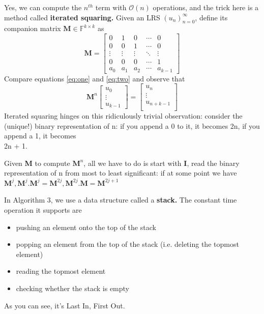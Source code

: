 \documentclass{article}
\begin{document}
Yes, we can compute the $n^{th}$ term with $\mathcal{O}(n)$ operations, and the trick here is a method called \textbf{iterated squaring.} Given an LRS $(u_n)_{n=0}^{\infty}$, define its companion matrix $\textbf{M} \in \mathbb{F}^{k \times k}$ as
\begin{equation}
\label{eq:two}
    \textbf{M} = 
    \begin{bmatrix}
     0 & 1 & 0 & \cdots & 0 \\
     0 & 0 & 1 & \cdots & 0 \\
     \vdots & \vdots & \vdots & \ddots & \vdots \\
     0 & 0 & 0 & \cdots & 1 \\
     a_{0} & a_{1} & a_{2} & \cdots & a_{k-1}
    \end{bmatrix}
\end{equation}
Compare equations \ref{eq:one} and \ref{eq:two} and observe that
\begin{equation}
\label{eq:three}
    \textbf{M}^n
    \begin{bmatrix}
     u_0 \\
     \vdots \\
     u_{k-1}
    \end{bmatrix}
    =
    \begin{bmatrix}
     u_n \\
     \vdots \\
     u_{n+k-1} \\
    \end{bmatrix}
\end{equation}
Iterated squaring hinges on this ridiculously trivial observation: consider the (unique!) binary representation of n: if you append a 0 to it, it becomes 2n, if you append a 1, it becomes \\2n + 1.

Given \textbf{M} to compute $\textbf{M}^n$, all we have to do is start with \textbf{I}, read the binary representation of n from most to least significant: if at some point we have $\textbf{M}^j,\textbf{M}^j.\textbf{M}^j=\textbf{M}^{2j},\textbf{M}^{2j}.\textbf{M}=\textbf{M}^{2j+1}$

In Algorithm 3, we use a data structure called a \textbf{stack.} The constant time operation it supports are \begin{itemize}
    \item pushing an element onto the top of the stack
    \item popping an element from the top of the stack (i.e. deleting the topmost element)
    \item reading the topmost element
    \item checking whether the stack is empty
\end{itemize}
As you can see, it’s Last In, First Out.
\end{document}
